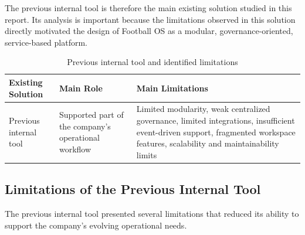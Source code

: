 The previous internal tool is therefore the main existing solution studied in
this report. Its analysis is important because the limitations observed in this
solution directly motivated the design of Football OS as a modular,
governance-oriented, service-based platform.

\begin{table}[ht]
\centering
\caption{Previous internal tool and identified limitations}
\label{tab:previous-internal-tool}
\begingroup
\small
\setlength{\tabcolsep}{4pt}
\renewcommand{\arraystretch}{1.15}
\begin{tabularx}{\textwidth}{|L{3.2cm}|Y|Y|}
\hline
\textbf{Existing Solution} & \textbf{Main Role} & \textbf{Main Limitations} \\
\hline
Previous internal tool & Supported part of the company's operational workflow & Limited modularity, weak centralized governance, limited integrations, insufficient event-driven support, fragmented workspace features, scalability and maintainability limits \\
\hline
\end{tabularx}
\endgroup
\end{table}

\subsection{Limitations of the Previous Internal Tool}

The previous internal tool presented several limitations that reduced its
ability to support the company's evolving operational needs.

